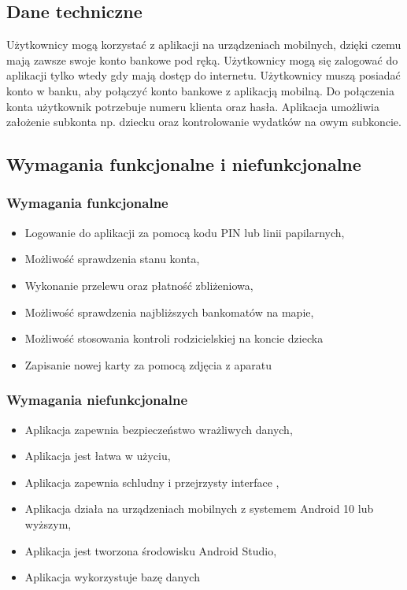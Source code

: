 \documentclass[12pt, letterpaper]{article}
\begin{document}
	\subsection{Dane techniczne}
	
	Użytkownicy mogą korzystać z aplikacji na urządzeniach mobilnych, dzięki czemu mają zawsze swoje konto bankowe pod ręką. Użytkownicy mogą się zalogować do aplikacji tylko wtedy gdy mają dostęp do internetu. Użytkownicy muszą posiadać konto w banku, aby połączyć konto bankowe z aplikacją mobilną. Do połączenia konta użytkownik potrzebuje numeru klienta oraz hasła. Aplikacja umożliwia założenie subkonta np. dziecku oraz kontrolowanie wydatków na owym subkoncie.

	\subsection{Wymagania funkcjonalne i niefunkcjonalne}

		\subsubsection{Wymagania funkcjonalne}
		
			\begin{itemize}
				\item Logowanie do aplikacji za pomocą kodu PIN lub linii papilarnych,
				\item Możliwość sprawdzenia stanu konta,
				\item Wykonanie przelewu oraz płatność zbliżeniowa,
				\item Możliwość sprawdzenia najbliższych bankomatów na mapie,
				\item Możliwość stosowania kontroli rodzicielskiej na koncie dziecka
				\item Zapisanie nowej karty za pomocą zdjęcia z aparatu
			\end{itemize}
			
		\subsubsection{Wymagania niefunkcjonalne}
		
			\begin{itemize}
				\item Aplikacja zapewnia bezpieczeństwo wrażliwych danych,
				\item Aplikacja jest łatwa w użyciu,
				\item Aplikacja zapewnia schludny i przejrzysty interface ,
				\item Aplikacja działa na urządzeniach mobilnych z systemem Android 10 lub wyższym,
				\item Aplikacja jest tworzona środowisku Android Studio,
				\item Aplikacja wykorzystuje bazę danych 
			\end{itemize}


 
\end{document}
